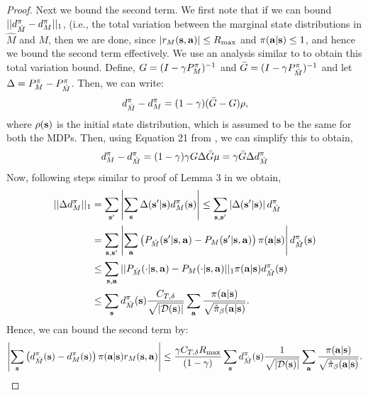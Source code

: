 \begin{proof}
Next we bound the second term. We first note that if we can bound $\vert\vert d^\pi_{\hat{M}} - d^\pi_M \vert\vert_1$, (i.e., the total variation between the marginal state distributions in $\hat{M}$ and $M$, then we are done, since $|r_M(\mathbf{s}, \mathbf{a})| \leq R_{\max}$ and $\pi(\mathbf{a}|\mathbf{s}) \leq 1$, and hence we bound the second term effectively. We use an analysis similar to \citet{achiam2017constrained} to obtain this total variation bound. Define, $G = (I - \gamma P^{\pi}_{M})^{-1}$ and $\bar{G} = (I - \gamma P^\pi_{\hat{M}})^{-1}$ and let $\Delta = P^\pi_{M} - P^{\pi}_{\hat{M}}$. Then, we can write:
\begin{equation*}
    d^\pi_{\hat{M}} - d^\pi_{M} = (1 - \gamma) (\bar{G} - G) \rho,
\end{equation*}
where $\rho(\mathbf{s})$ is the initial state distribution, which is assumed to be the same for both the MDPs. Then, using Equation 21 from \citet{achiam2017constrained}, we can simplify this to obtain,
\begin{equation*}
    d^\pi_{{M}} - d^\pi_{\hat{M}} = (1 - \gamma) \gamma {G} \Delta \bar{G} \mu = \gamma \bar{G} \Delta d^\pi_{\hat{M}}
\end{equation*}
Now, following steps similar to proof of Lemma 3 in \citet{achiam2017constrained} we obtain,
\begin{align*}
    \vert\vert \Delta d^\pi_M||_{1} &= \sum_{\mathbf{s}'} \left\vert \sum_{\mathbf{s}} \Delta(\mathbf{s}'|\mathbf{s}) d^\pi_{M}(\mathbf{s}) \right\vert \leq \sum_{\mathbf{s}, \mathbf{s}'} \left\vert \Delta(\mathbf{s}'|\mathbf{s}) \right\vert d^\pi_{\hat{M}}\\
    &= \sum_{\mathbf{s}, \mathbf{s}'} \left\vert \sum_{\mathbf{a}} \left(P_{\hat{M}}(\mathbf{s}'|\mathbf{s}, \mathbf{a}) - P_{M}(\mathbf{s}'|\mathbf{s}, \mathbf{a}) \right) \pi(\mathbf{a}|\mathbf{s}) \right\vert d^\pi_{\hat{M}}(\mathbf{s}) \\
    &\leq \sum_{\mathbf{s}, \mathbf{a}} \vert\vert P_{\hat{M}}(\cdot|\mathbf{s}, \mathbf{a}) - P_M(\cdot|\mathbf{s}, \mathbf{a}) \vert\vert_{1} \pi(\mathbf{a}|\mathbf{s}) d^\pi_{\hat{M}}(\mathbf{s})\\
    &\leq \sum_{\mathbf{s}} d^\pi_{\hat{M}}(\mathbf{s}) \frac{C_{T, \delta}}{\sqrt{|\mathcal{D}(\mathbf{s})|}} \sum_{\mathbf{a}}  \frac{\pi(\mathbf{a}|\mathbf{s})}{\sqrt{\hat{\pi}_\beta(\mathbf{a}|\mathbf{s})}}.
\end{align*}
Hence, we can bound the second term by:
\begin{align*}
    \left\vert \sum_{\mathbf{s}} \left(d^\pi_{\hat{M}}(\mathbf{s}) - d^\pi_{{M}}(\mathbf{s}) \right) \pi(\mathbf{a}|\mathbf{s}) r_M(\mathbf{s}, \mathbf{a}) \right\vert \leq \frac{\gamma C_{T, \delta} R_{\max}}{(1 - \gamma)} \sum_{\mathbf{s}} d^\pi_{\hat{M}}(\mathbf{s}) \frac{1}{\sqrt{|\mathcal{D}(\mathbf{s})|}} \sum_{\mathbf{a}}  \frac{\pi(\mathbf{a}|\mathbf{s})}{\sqrt{\hat{\pi}_\beta(\mathbf{a}|\mathbf{s})}}.
\end{align*}


\end{proof}
